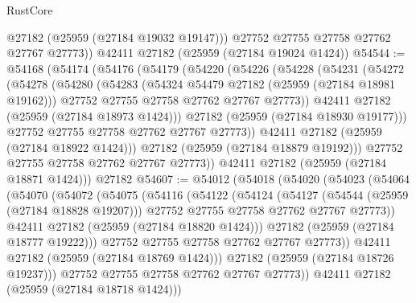 \begin{lexlean}{RustCore}
\begin{coremodule}
          @27182
          (@25959 (@27184 @19032 @19147)))
        @27752
        @27755
        @27758
        @27762
        @27767
        @27773))
    @42411
    @27182
    (@25959 (@27184 @19024 @1424))
@54544 := @54168
    (@54174
      (@54176
        (@54179
          (@54220
            (@54226
              (@54228
                (@54231
                  (@54272
                    (@54278
                      (@54280
                        (@54283
                          (@54324 @54479 @27182 (@25959 (@27184 @18981 @19162)))
                          @27752
                          @27755
                          @27758
                          @27762
                          @27767
                          @27773))
                      @42411
                      @27182
                      (@25959 (@27184 @18973 @1424)))
                    @27182
                    (@25959 (@27184 @18930 @19177)))
                  @27752
                  @27755
                  @27758
                  @27762
                  @27767
                  @27773))
              @42411
              @27182
              (@25959 (@27184 @18922 @1424)))
            @27182
            (@25959 (@27184 @18879 @19192)))
          @27752
          @27755
          @27758
          @27762
          @27767
          @27773))
      @42411
      @27182
      (@25959 (@27184 @18871 @1424)))
    @27182
@54607 := @54012
    (@54018
      (@54020
        (@54023
          (@54064
            (@54070
              (@54072
                (@54075
                  (@54116
                    (@54122
                      (@54124
                        (@54127
                          (@54544 (@25959 (@27184 @18828 @19207)))
                          @27752
                          @27755
                          @27758
                          @27762
                          @27767
                          @27773))
                      @42411
                      @27182
                      (@25959 (@27184 @18820 @1424)))
                    @27182
                    (@25959 (@27184 @18777 @19222)))
                  @27752
                  @27755
                  @27758
                  @27762
                  @27767
                  @27773))
              @42411
              @27182
              (@25959 (@27184 @18769 @1424)))
            @27182
            (@25959 (@27184 @18726 @19237)))
          @27752
          @27755
          @27758
          @27762
          @27767
          @27773))
      @42411
      @27182
      (@25959 (@27184 @18718 @1424)))

\end{coremodule}
\end{lexlean}
